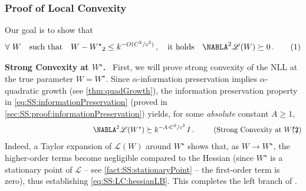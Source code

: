 \documentclass[11pt,letterpaper]{article}
\theoremstyle{plain}
\theoremstyle{definition}
\theoremstyle{remark}
\newcommand{\yesnum}{\addtocounter{equation}{1}\tag{\theequation}}
\newcommand{\quadtext}[1]{\quad\text{#1}\quad}
\let\norm\relax
\newcommand{\norm}[1]{\ensuremath{\left\lVert #1 \right\rVert}}
\newcommand{\sfrac}[2]{{#1/#2}}
\newcommand*{\Nabla}{\boldsymbol\NABLA}
\let\nabla\Nabla
\newcommand{\customcal}[1]{\euscr{#1}}
\newcommand{\cL}{\customcal{L}}
\renewcommand{\paragraph}[1]{\medskip \noindent\textbf{#1}~}
\newcommand{\negLL}{\ensuremath{\mathscr{L}}}
\newcommand{\Wstar}{{W^\star}}
\renewcommand{\cL}{\negLL}
\begin{document}
{{\subsubsection{Proof of Local Convexity}\label{sec:SS:proof:localConvexity:main}
        Our goal is to show that 
        \[
            \forall~W\quadtext{such that}
            \norm{W-\Wstar}_2 \leq k^{-O(\sfrac{C^2}{c^2})}\,,
            \quadtext{it holds} \nabla^2 \cL(W) \succeq 0 \,.
            \yesnum\label{eq:SS:LC:sufficientCondition}
        \] 
    
    \paragraph{Strong Convexity at $W^\star$.}
    First, we will prove strong convexity of the NLL at the true parameter $W = W^\star$.
    Since $\alpha$-information preservation implies $\alpha$-quadratic growth (see \cref{thm:quadGrowth}), the information preservation property in \cref{eq:SS:informationPreservation} (proved in \cref{sec:SS:proof:informationPreservation}) yields, for some \textit{absolute} constant $A\ge 1$,
    \[
        \phantom{.}
        \qquad\qquad\qquad\qquad\qquad\quad~~
        \nabla^2 \cL(W^\star) \succeq k^{-A\cdot C^2/c^2}\, I\,. 
        \qquad~~
        \text{(Strong Convexity at $\Wstar$)}\hspace{-10mm}
        \yesnum\label{eq:SS:LC:hessianLB}
    \]
    Indeed, a Taylor expansion of $\cL(W)$ around $W^\star$ shows that, as $W\to W^\star$, the higher-order terms become negligible compared to the Hessian (since $W^\star$ is a stationary point of $\cL$ -- see \cref{fact:SS:stationaryPoint} -- the first-order term is zero), thus establishing \cref{eq:SS:LC:hessianLB}. This completes the left branch of .

}}
\end{document}
